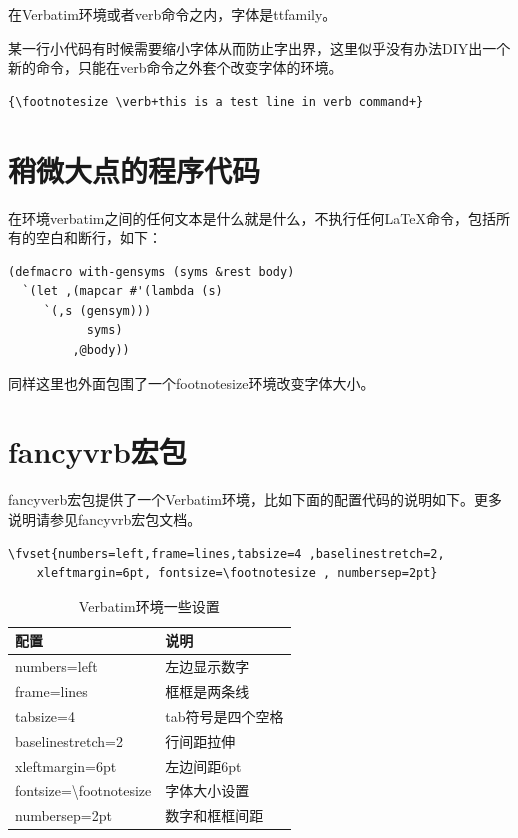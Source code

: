 \documentclass[11pt,oneside]{book}
\begin{document}
在Verbatim环境或者verb命令之内，字体是ttfamily。

某一行小代码有时候需要缩小字体从而防止字出界，这里似乎没有办法DIY出一个新的命令，只能在verb命令之外套个改变字体的环境。
\begin{Verbatim}
{\footnotesize \verb+this is a test line in verb command+}
\end{Verbatim}



\section{稍微大点的程序代码}
在环境verbatim之间的任何文本是什么就是什么，不执行任何\LaTeX 命令，包括所有的空白和断行，如下：
\begin{footnotesize}
\begin{verbatim}
(defmacro with-gensyms (syms &rest body)
  `(let ,(mapcar #'(lambda (s)
     `(,s (gensym)))
           syms)
         ,@body))
\end{verbatim}
\end{footnotesize}
同样这里也外面包围了一个footnotesize环境改变字体大小。


\section{fancyvrb宏包}
fancyverb宏包提供了一个Verbatim环境，比如下面的配置代码的说明如下。更多说明请参见fancyvrb宏包文档。
\begin{Verbatim}
\fvset{numbers=left,frame=lines,tabsize=4 ,baselinestretch=2,
    xleftmargin=6pt, fontsize=\footnotesize , numbersep=2pt}
\end{Verbatim}

\begin{table}[H]
\centering
\caption{Verbatim环境一些设置}
\label{tab:Verbatim环境一些设置}
\medskip 
\begin{tabular}{@{}ll@{}}
\toprule
配置                        & 说明     \\ \midrule
numbers=left                         & 左边显示数字     \\
frame=lines                          & 框框是两条线     \\
tabsize=4                            & tab符号是四个空格 \\
baselinestretch=2                    & 行间距拉伸      \\
xleftmargin=6pt                      & 左边间距6pt    \\
fontsize=\textbackslash footnotesize & 字体大小设置     \\  
numbersep=2pt                        & 数字和框框间距 \\   \bottomrule
\end{tabular}
\end{table}
\end{document}
